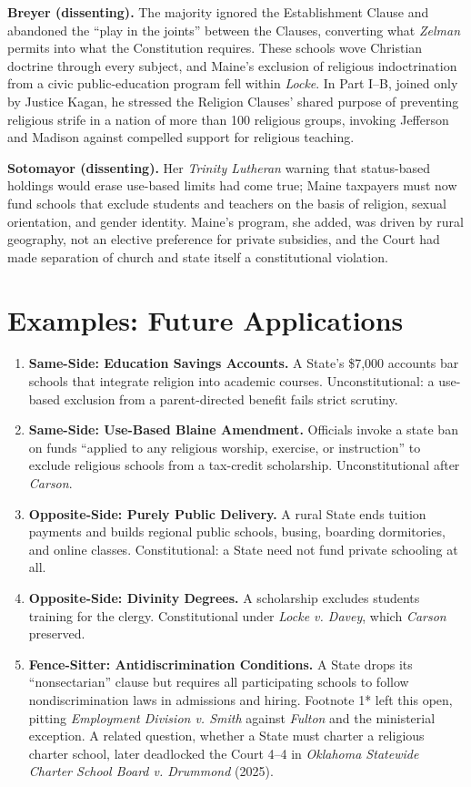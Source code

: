 \documentclass[12pt]{article}
\begin{document}
\textbf{Breyer (dissenting).} The majority ignored the Establishment Clause and abandoned the ``play in the joints'' between the Clauses, converting what \textit{Zelman} permits into what the Constitution requires. These schools wove Christian doctrine through every subject, and Maine's exclusion of religious indoctrination from a civic public-education program fell within \textit{Locke}. In Part I--B, joined only by Justice Kagan, he stressed the Religion Clauses' shared purpose of preventing religious strife in a nation of more than 100 religious groups, invoking Jefferson and Madison against compelled support for religious teaching.

\textbf{Sotomayor (dissenting).} Her \textit{Trinity Lutheran} warning that status-based holdings would erase use-based limits had come true; Maine taxpayers must now fund schools that exclude students and teachers on the basis of religion, sexual orientation, and gender identity. Maine's program, she added, was driven by rural geography, not an elective preference for private subsidies, and the Court had made separation of church and state itself a constitutional violation.

\section{Examples: Future Applications}

\begin{enumerate}
\item \textbf{Same-Side: Education Savings Accounts.} A State's \$7,000 accounts bar schools that integrate religion into academic courses. Unconstitutional: a use-based exclusion from a parent-directed benefit fails strict scrutiny.
\item \textbf{Same-Side: Use-Based Blaine Amendment.} Officials invoke a state ban on funds ``applied to any religious worship, exercise, or instruction'' to exclude religious schools from a tax-credit scholarship. Unconstitutional after \textit{Carson}.
\item \textbf{Opposite-Side: Purely Public Delivery.} A rural State ends tuition payments and builds regional public schools, busing, boarding dormitories, and online classes. Constitutional: a State need not fund private schooling at all.
\item \textbf{Opposite-Side: Divinity Degrees.} A scholarship excludes students training for the clergy. Constitutional under \textit{Locke v. Davey}, which \textit{Carson} preserved.
\item \textbf{Fence-Sitter: Antidiscrimination Conditions.} A State drops its ``nonsectarian'' clause but requires all participating schools to follow nondiscrimination laws in admissions and hiring. Footnote 1* left this open, pitting \textit{Employment Division v. Smith} against \textit{Fulton} and the ministerial exception. A related question, whether a State must charter a religious charter school, later deadlocked the Court 4--4 in \textit{Oklahoma Statewide Charter School Board v. Drummond} (2025).
\end{enumerate}
\end{document}
